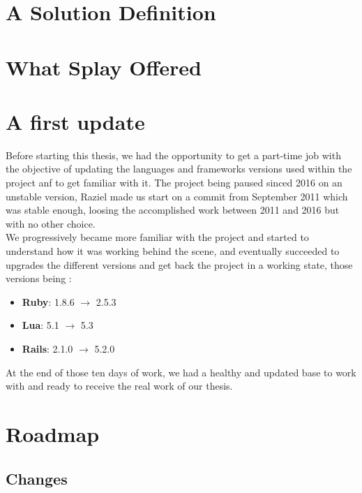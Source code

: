\documentclass{eplmastersthesis}
\begin{document}
    \section{A Solution Definition}

    \section{What Splay Offered}

    \section{A first update}

      Before starting this thesis, we had the opportunity to get a part-time
      job with the objective of updating the languages and frameworks versions
      used within the project anf to get familiar with it. The project being
      paused sinced 2016 on an unstable version, Raziel made us start on a
      commit from September 2011 which was stable enough, loosing the
      accomplished work between 2011 and 2016 but with no other choice.\\

      We progressively became more familiar with the project and started to
      understand how it was working behind the scene, and eventually succeeded
      to upgrades the different versions and get back the project in a working
      state, those versions being :

      \begin{itemize}
        \item \textbf{Ruby}: 1.8.6 $\rightarrow$ 2.5.3
        \item \textbf{Lua}: 5.1 $\rightarrow$ 5.3
        \item \textbf{Rails}: 2.1.0 $\rightarrow$ 5.2.0
      \end{itemize}

      At the end of those ten days of work, we had a healthy and updated
      base to work with and ready to receive the real work of our thesis.\\


    \section{Roadmap}

      \subsection{Changes}
\end{document}
